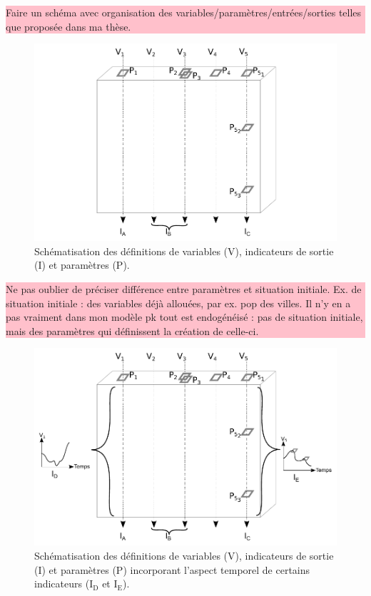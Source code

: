 \documentclass[12pt, a4paper, oneside]{book}
\begin{document}
	
		\colorbox{pink}{\parbox{0.9\textwidth}{%
			\vskip5pt
			Faire un schéma avec organisation des variables/paramètres/entrées/sorties telles que proposée dans ma thèse.
			\vskip5pt
		}
	}



	\begin{figure}[!h]
	\includegraphics[width=\linewidth]{img/schemas_params_simple.pdf}
	\caption{Schématisation des définitions de variables (V), indicateurs de sortie (I) et paramètres (P).} 
	\label{fig:parametres-these-simple} 
	\end{figure}

	\colorbox{pink}{\parbox{0.9\textwidth}{%
		\vskip5pt
		Ne pas oublier de préciser différence entre paramètres et situation initiale. Ex. de situation initiale : des variables déjà allouées, par ex. pop des villes.
		Il n'y en a pas vraiment dans mon modèle pk tout est endogénéisé : pas de situation initiale, mais des paramètres qui définissent la création de celle-ci.
		\vskip5pt
	}
}

	\begin{figure}[!h]
	\includegraphics[width=\linewidth]{img/schemas_params_complet.pdf}
	\caption{Schématisation des définitions de variables (V), indicateurs de sortie (I) et paramètres (P) incorporant l'aspect temporel de certains indicateurs ($\text{I}_{\text{D}}$ et $\text{I}_{\text{E}}$).} 
	\label{fig:parametres-these-complet} 
	\end{figure}
	
\end{document}
